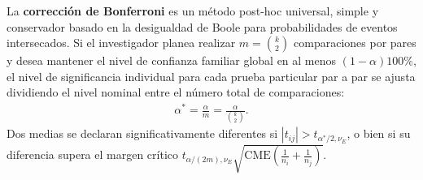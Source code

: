 La \textbf{corrección de Bonferroni} es un método post-hoc universal, simple y conservador basado en la desigualdad de Boole para probabilidades de eventos intersecados. Si el investigador planea realizar $m = \binom{k}{2}$ comparaciones por pares y desea mantener el nivel de confianza familiar global en al menos $(1-\alpha)100\%$, el nivel de significancia individual para cada prueba particular par a par se ajusta dividiendo el nivel nominal entre el número total de comparaciones:
\begin{align}
	\alpha^* = \frac{\alpha}{m} = \frac{\alpha}{\binom{k}{2}}.
\end{align}
Dos medias se declaran significativamente diferentes si $|t_{ij}| > t_{\alpha^*/2, \nu_E}$, o bien si su diferencia supera el margen crítico $t_{\alpha/(2m), \nu_E} \sqrt{\text{CME}(\frac{1}{n_i}+\frac{1}{n_j})}$.
